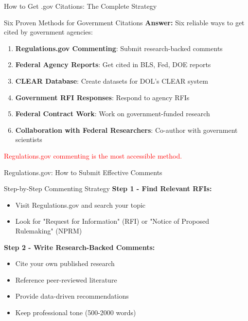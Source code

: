 \documentclass[11pt]{beamer}
\begin{document}
	\begin{frame}{How to Get .gov Citations: The Complete Strategy}
		\small
		\begin{block}{Six Proven Methods for Government Citations}
			\textbf{Answer:} Six reliable ways to get cited by government agencies:
			\vspace{0.1cm}
			\begin{enumerate}
				\item \textbf{Regulations.gov Commenting}: Submit research-backed comments
				\item \textbf{Federal Agency Reports}: Get cited in BLS, Fed, DOE reports
				\item \textbf{CLEAR Database}: Create datasets for DOL's CLEAR system
				\item \textbf{Government RFI Responses}: Respond to agency RFIs
				\item \textbf{Federal Contract Work}: Work on government-funded research
				\item \textbf{Collaboration with Federal Researchers}: Co-author with government scientists
			\end{enumerate}
			\textcolor{red}{Regulations.gov commenting is the most accessible method.}
		\end{block}
	\end{frame}
	
	\begin{frame}{Regulations.gov: How to Submit Effective Comments}
		\small
		\begin{block}{Step-by-Step Commenting Strategy}
			\textbf{Step 1 - Find Relevant RFIs:}
			\begin{itemize}
				\item Visit Regulations.gov and search your topic
				\item Look for "Request for Information" (RFI) or "Notice of Proposed Rulemaking" (NPRM)
			\end{itemize}
			\textbf{Step 2 - Write Research-Backed Comments:}
			\begin{itemize}
				\item Cite your own published research
				\item Reference peer-reviewed literature
				\item Provide data-driven recommendations
				\item Keep professional tone (500-2000 words)
			\end{itemize}
		\end{block}
	\end{frame}
	
\end{document}
